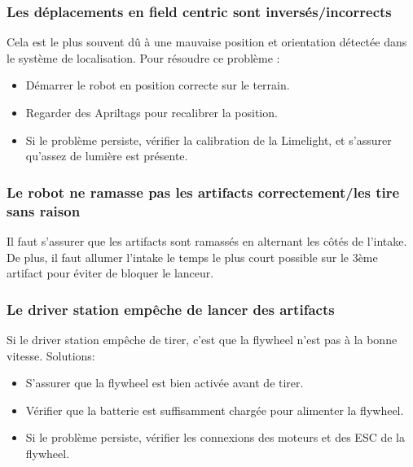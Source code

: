 \documentclass[12pt, a4paper]{report}
\begin{document}
    \subsubsection{Les déplacements en field centric sont inversés/incorrects}

    Cela est le plus souvent dû à une mauvaise position et orientation détectée dans le système de localisation. Pour résoudre ce problème :
    \begin{itemize}
        \item Démarrer le robot en position correcte sur le terrain.
        \item Regarder des Apriltags pour recalibrer la position.
        \item Si le problème persiste, vérifier la calibration de la Limelight, et s'assurer qu'assez de lumière est présente.
    \end{itemize}

    \subsubsection{Le robot ne ramasse pas les artifacts correctement/les tire sans raison}
    Il faut s'assurer que les artifacts sont ramassés en alternant les côtés de l'intake. De plus, il faut allumer l'intake le temps le plus court possible sur le 3ème artifact pour éviter de bloquer le lanceur.

    \subsubsection{Le driver station empêche de lancer des artifacts}

    Si le driver station empêche de tirer, c'est que la flywheel n'est pas à la bonne vitesse. Solutions:
    \begin{itemize}
        \item S'assurer que la flywheel est bien activée avant de tirer.
        \item Vérifier que la batterie est suffisamment chargée pour alimenter la flywheel.
        \item Si le problème persiste, vérifier les connexions des moteurs et des ESC de la flywheel.
    \end{itemize}
\end{document}
